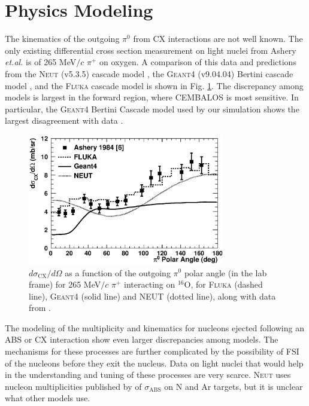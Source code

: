 \section{Physics Modeling}\label{sec:physics}
The kinematics of the outgoing $\pi^0$ from CX interactions are not well known. The only existing differential cross section measurement on light nuclei from Ashery \textit{et.al.} \cite{Ashery2} is of 265 MeV$/c$ $\pi^{+}$ on oxygen. A comparison of this data and predictions from the \textsc{Neut} (v5.3.5) cascade model \cite{NEUT}, the \textsc{Geant4} (v9.04.04) Bertini cascade model \cite{bertini}, and the \textsc{Fluka} cascade model \cite{fluka1,fluka2} is shown in Fig. \ref{fig:pi0kinem}. The discrepancy among models is largest in the forward region, where CEMBALOS is most sensitive. In particular, the \textsc{Geant4} Bertini Cascade model used by our simulation shows the largest disagreement with data \cite{Ashery2}.

\begin{figure}[h]
 \includegraphics[width=86mm]{figures/dsigma_cx_o16_data_and_models.eps}
 \caption{$d\sigma_{\mathrm{CX}}/d\Omega$ as a function of the outgoing $\pi^0$ polar angle (in the lab frame) for 265 MeV$/c$ $\pi^{+}$ interacting on $^{16}$O, for \textsc{Fluka} (dashed line), \textsc{Geant4} (solid line) and \textsc{NEUT} (dotted line), along with data from \cite{Ashery2}.}
 \label{fig:pi0kinem}
\end{figure}

The modeling of the multiplicity and kinematics for nucleons ejected following an ABS or CX interaction show even larger discrepancies among models. The mechanisms for these processes are further complicated by the possibility of FSI of the nucleons before they exit the nucleus. Data on light nuclei that would help in the understanding and tuning of these processes are very scarce. \textsc{Neut} uses nucleon multiplicities published by \cite{Rowntree} of $\sigma_{\mathrm{ABS}}$ on N and Ar targets, but it is unclear what other models use.
